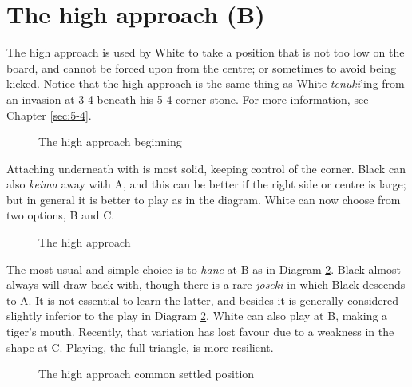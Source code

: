 \documentclass[a5paper,12pt,twoside]{book} %
\newcounter{joseki}                 %
\newcommand{\dref}[1]{Diagram \ref{#1}}
\newcommand{\addstufftotoc}[2][toc]{%
  \addtocontents{#1}{#2}}
\begin{document}
\addstufftotoc{\nobreak\smallskip\protect\par}

\section{The high approach (B)}

The high approach is used by White to take a position that is not too low on the board, and cannot be forced upon from the centre; or sometimes to avoid being kicked. Notice that the high approach is the same thing as White \textit{tenuki}'ing from an invasion at 3-4 beneath his 5-4 corner stone. For more information, see Chapter \ref{sec:5-4}.\\

\begin{figure}[!htbp]
 
\vspace{-0.6cm}\caption{The high approach beginning}
\label{3-4:high-approach-1}
\end{figure}

Attaching underneath with{\large\blackstone[2]} is most solid, keeping control of the corner. Black can also \textit{keima} away with A, and this can be better if the right side or centre is large; but in general it is better to play as in the diagram. White can now choose from two options, B and C.\\

\begin{figure}[!htbp]
 
\vspace{-0.6cm}\caption{The high approach}
\label{3-4:high-approach-2}
\end{figure}

The most usual and simple choice is to \textit{hane} at B as in \dref{3-4:high-approach-2}. Black almost always will draw back with{\large\blackstone[4]}, though there is a rare \textit{joseki} in which Black descends to A. It is not essential to learn the latter, and besides it is generally considered slightly inferior to the play in \dref{3-4:high-approach-2}. White can also play{\large\whitestone[5]} at B, making a tiger's mouth. Recently, that variation has lost favour due to a weakness in the shape at C. Playing{\large\whitestone[5]}, the full triangle, is more resilient.\\

\begin{figure}[!htbp]

\vspace{-0.6cm}\caption{The high approach common settled position}
\label{3-4:high-approach-3}
\end{figure}
\end{document}
